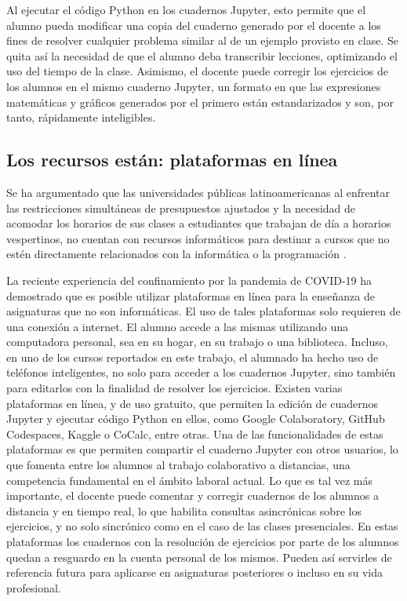 \documentclass[a4paper]{fodami}        %
\begin{document}
Al ejecutar el código Python en los cuadernos Jupyter, esto permite que el alumno pueda modificar una copia del cuaderno generado por el docente a los fines de resolver cualquier problema similar al de un ejemplo provisto en clase.
Se quita así la necesidad de que el alumno deba transcribir lecciones, optimizando el uso del tiempo de la clase.
Asimismo, el docente puede corregir los ejercicios de los alumnos en el mismo cuaderno Jupyter, un formato en que las expresiones matemáticas y gráficos generados por el primero están estandarizados y son, por tanto, rápidamente inteligibles.



\subsection{Los recursos están: plataformas en línea}

Se ha argumentado que las universidades públicas latinoamericanas al enfrentar las restricciones simultáneas de presupuestos ajustados y la necesidad de acomodar los horarios de sus clases a estudiantes que trabajan de día a horarios vespertinos, no cuentan con recursos informáticos para destinar a cursos que no estén directamente relacionados con la informática o la programación 
\cite{vallejo_google_2022}.%

La reciente experiencia del confinamiento por la pandemia de COVID-19 ha demostrado que es posible utilizar plataformas en línea para la enseñanza de asignaturas que no son informáticas.
El uso de tales plataformas solo requieren de una conexión a internet.
El alumno accede a las mismas utilizando una computadora personal, sea en su hogar, en su trabajo o una biblioteca. 
Incluso, en uno de los cursos reportados en este trabajo, el alumnado ha hecho uso de teléfonos inteligentes, no solo para acceder a los cuadernos Jupyter, sino también para editarlos con la finalidad de resolver los ejercicios.
Existen varias plataformas en línea, y de uso gratuito, que permiten la edición de cuadernos Jupyter y ejecutar código Python en ellos, como Google Colaboratory, GitHub Codespaces, Kaggle o CoCalc, entre otras.
Una de las funcionalidades de estas plataformas es que permiten compartir el cuaderno Jupyter con otros usuarios, lo que fomenta entre los alumnos al trabajo colaborativo a distancias, una competencia fundamental en el ámbito laboral actual.
Lo que es tal vez más importante, el docente puede comentar y corregir cuadernos de los alumnos a distancia y en tiempo real, lo que habilita consultas asincrónicas sobre los ejercicios, y no solo sincrónico como en el caso de las clases presenciales.
En estas plataformas los cuadernos con la resolución de ejercicios por parte de los alumnos quedan a resguardo en la cuenta personal de los mismos.
Pueden así servirles de referencia futura para aplicarse en asignaturas posteriores o incluso en su vida profesional.
\end{document}
